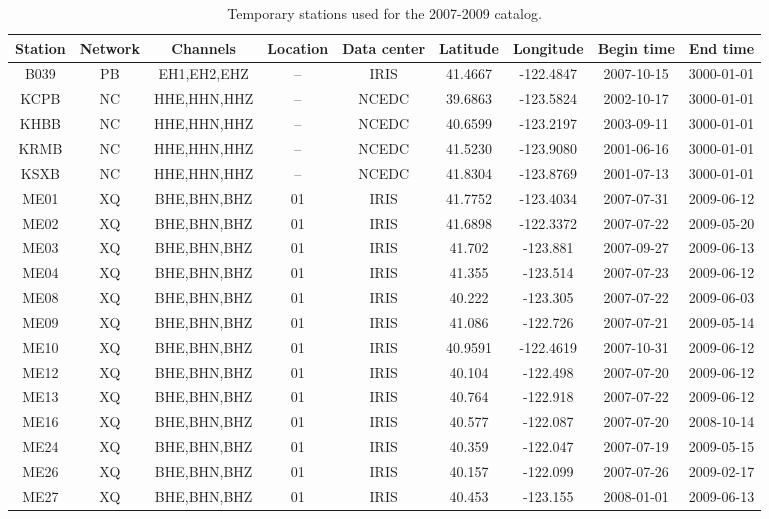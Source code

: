 \documentclass[draft]{agujournal2019}
\begin{document}
\begin{table}
\caption{Temporary stations used for the 2007-2009 catalog.}
\centering
\footnotesize
\begin{tabular}{c c c c c c c c c}
\hline
Station & Network & Channels & Location & Data center & Latitude & Longitude & Begin time & End time \\
\hline
B039 & PB & EH1,EH2,EHZ & -- & IRIS & 41.4667 & -122.4847 & 2007-10-15 & 3000-01-01 \\
KCPB & NC & HHE,HHN,HHZ & -- & NCEDC & 39.6863 & -123.5824 & 2002-10-17 & 3000-01-01 \\
KHBB & NC & HHE,HHN,HHZ & -- & NCEDC & 40.6599 & -123.2197 & 2003-09-11 & 3000-01-01 \\
KRMB & NC & HHE,HHN,HHZ & -- & NCEDC & 41.5230 & -123.9080 & 2001-06-16 & 3000-01-01 \\
KSXB & NC & HHE,HHN,HHZ & -- & NCEDC & 41.8304 & -123.8769 & 2001-07-13 & 3000-01-01 \\
ME01 & XQ & BHE,BHN,BHZ & 01 & IRIS & 41.7752 & -123.4034 & 2007-07-31 & 2009-06-12 \\
ME02 & XQ & BHE,BHN,BHZ & 01 & IRIS & 41.6898 & -122.3372 & 2007-07-22 & 2009-05-20 \\
ME03 & XQ & BHE,BHN,BHZ & 01 & IRIS & 41.702 & -123.881 & 2007-09-27 & 2009-06-13 \\
ME04 & XQ & BHE,BHN,BHZ & 01 & IRIS & 41.355 & -123.514 & 2007-07-23 & 2009-06-12 \\
ME08 & XQ & BHE,BHN,BHZ & 01 & IRIS & 40.222 & -123.305 & 2007-07-22 & 2009-06-03 \\
ME09 & XQ & BHE,BHN,BHZ & 01 & IRIS & 41.086 & -122.726 & 2007-07-21 & 2009-05-14 \\
ME10 & XQ & BHE,BHN,BHZ & 01 & IRIS & 40.9591 & -122.4619 & 2007-10-31 & 2009-06-12 \\
ME12 & XQ & BHE,BHN,BHZ & 01 & IRIS & 40.104 & -122.498 & 2007-07-20 & 2009-06-12 \\
ME13 & XQ & BHE,BHN,BHZ & 01 & IRIS & 40.764 & -122.918 & 2007-07-22 & 2009-06-12 \\
ME16 & XQ & BHE,BHN,BHZ & 01 & IRIS & 40.577 &  -122.087 & 2007-07-20 & 2008-10-14 \\
ME24 & XQ & BHE,BHN,BHZ & 01 & IRIS & 40.359 & -122.047 & 2007-07-19 & 2009-05-15 \\
ME26 & XQ & BHE,BHN,BHZ & 01 & IRIS & 40.157 & -122.099 & 2007-07-26 & 2009-02-17 \\
ME27 & XQ & BHE,BHN,BHZ & 01 & IRIS & 40.453 & -123.155 & 2008-01-01 & 2009-06-13 \\

\end{tabular}
\end{table}
\end{document}
